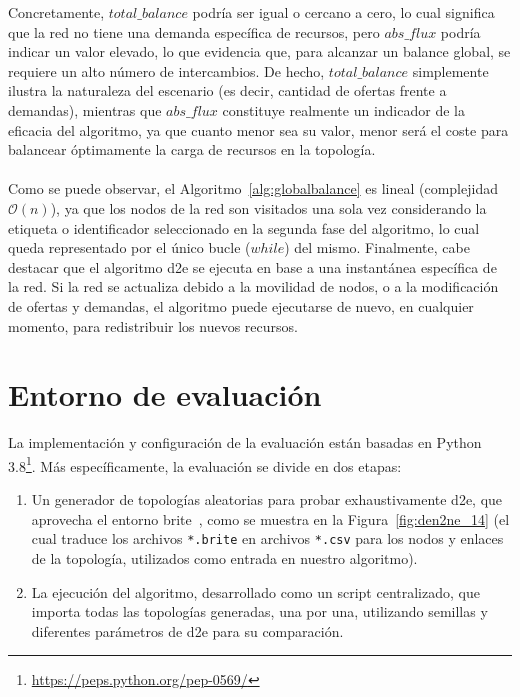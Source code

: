 Concretamente, $total\_balance$ podría ser igual o cercano a cero, lo cual significa que la red no tiene una demanda específica de recursos, pero $abs\_flux$ podría indicar un valor elevado, lo que evidencia que, para alcanzar un balance global, se requiere un alto número de intercambios. De hecho, $total\_balance$ simplemente ilustra la naturaleza del escenario (es decir, cantidad de ofertas frente a demandas), mientras que $abs\_flux$ constituye realmente un indicador de la eficacia del algoritmo, ya que cuanto menor sea su valor, menor será el coste para balancear óptimamente la carga de recursos en la topología.\\
\\
Como se puede observar, el Algoritmo~\ref{alg:globalbalance} es lineal (complejidad $\mathcal{O}(n)$), ya que los nodos de la red son visitados una sola vez considerando la etiqueta o identificador seleccionado en la segunda fase del algoritmo, lo cual queda representado por el único bucle ($while$) del mismo. Finalmente, cabe destacar que el algoritmo \gls{d2e} se ejecuta en base a una instantánea específica de la red. Si la red se actualiza debido a la movilidad de nodos, o a la modificación de ofertas y demandas, el algoritmo puede ejecutarse de nuevo, en cualquier momento, para redistribuir los nuevos recursos.

\section{Entorno de evaluación}
\label{sec:den2ne_setup}
La implementación y configuración de la evaluación están basadas en Python 3.8\footnote{\url{https://peps.python.org/pep-0569/}}. Más específicamente, la evaluación se divide en dos etapas:

\begin{enumerate}
    \item Un generador de topologías aleatorias para probar exhaustivamente \gls{d2e}, que aprovecha el entorno \gls{brite}~\cite{brite}, como se muestra en la Figura~\ref{fig:den2ne_14} (el cual traduce los archivos \texttt{*.brite} en archivos \texttt{*.csv} para los nodos y enlaces de la topología, utilizados como entrada en nuestro algoritmo).
   
    \item La ejecución del algoritmo, desarrollado como un script centralizado, que importa todas las topologías generadas, una por una, utilizando semillas y diferentes parámetros de \gls{d2e} para su comparación. 
\end{enumerate}

